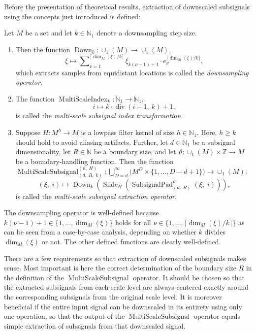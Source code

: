 \documentclass[journal]{IEEEtran}
\newcommand{\N}{\mathbb{N}}
\newcommand{\Z}{\mathbb{Z}}
\newcommand{\discint}[2]{\{#1,\dotsc,#2\}}
\newcommand{\inint}[2]{\in\discint{#1}{#2}}
\newcommand{\nceil}[1]{\lceil #1 \rceil}
\DeclareMathOperator{\Slide}{Slide}
\renewcommand{\div}[2]{\operatorname{div}(#1,\ #2)}
\DeclareMathOperator{\Downsampling}{Down}
\DeclareMathOperator{\SubsignalPad}{SubsignalPad}
\newcommand{\SubsignalPadParams}{\SubsignalPad_{(d,\; R)}^{\vartheta}}
\DeclareMathOperator{\MultiScaleSubsignal}{MultiScaleSubsignal}
\newcommand{\MultiScaleSubsignalParams}{\MultiScaleSubsignal_{(d,\; R,\; k)}^{(\vartheta,\; H)}}
\DeclareMathOperator{\MultiScaleIndex}{MultiScaleIndex}
\begin{document}
Before the presentation of theoretical results, extraction of downscaled subsignals using the concepts just introduced is defined:
\begin{definition}
\label{def:downsampling}
Let $M$ be a set and let $k\in\N_1$ denote a downsampling step size.
\begin{enumerate}
  \item Then the function $\Downsampling_k\colon\cup_1(M)\to \cup_1(M)$,
    \begin{displaymath}
      \xi\mapsto\sum\nolimits_{\nu = 1}^{\nceil{\dim_M(\xi) / k}} \xi_{k (\nu - 1) + 1}\cdot e_\nu^{\nceil{\dim_M(\xi) / k}}\text{,}
    \end{displaymath}
    which extracts samples from equidistant locations is called the \emph{downsampling operator}.
  \item The function $\MultiScaleIndex_k\colon\N_1\to\N_1$,
    \begin{displaymath}
      i\mapsto k\cdot\div{i - 1}{k} + 1\text{,}
    \end{displaymath}
    is called the \emph{multi-scale subsignal index transformation}.
  \item Suppose $H\colon M^h\to M$ is a lowpass filter kernel of size $h\in\N_1$.
    Here, $h\geq k$ should hold to avoid aliasing artifacts.
    Further, let $d\in\N_1$ be a subsignal dimensionality, let $R\in\N$ be a boundary size, and let $\vartheta\colon\cup_1(M)\times\Z\to M$ be a boundary-handling function.
    Then the function $\MultiScaleSubsignalParams\colon\bigcup\nolimits_{D = d}^\infty\big(M^D\times\discint{1}{D - d + 1}\big)\to\cup_1(M)$,
    \begin{displaymath}
      (\xi,\; i)\mapsto\Downsampling_k(\Slide_H(\SubsignalPadParams(\xi,\;i)))\text{,}
    \end{displaymath}
    is called the \emph{multi-scale subsignal extraction operator}.
\end{enumerate}
\end{definition}

The downsampling operator is well-defined because $k (\nu - 1) + 1\inint{1}{\dim_M(\xi)}$ holds for all $\nu\inint{1}{\nceil{\dim_M(\xi) / k}}$ as can be seen from a case-by-case analysis, depending on whether $k$ divides $\dim_M(\xi)$ or not.
The other defined functions are clearly well-defined.

There are a few requirements so that extraction of downscaled subsignals makes sense.
Most important is here the correct determination of the boundary size $R$ in the definition of the $\MultiScaleSubsignal$ operator.
It should be chosen so that the extracted subsignals from each scale level are always centered exactly around the corresponding subsignals from the original scale level.
It is moreover beneficial if the entire input signal can be downscaled in its entirety using only one operation, so that the output of the $\MultiScaleSubsignal$ operator equals simple extraction of subsignals from that downscaled signal.
\end{document}
